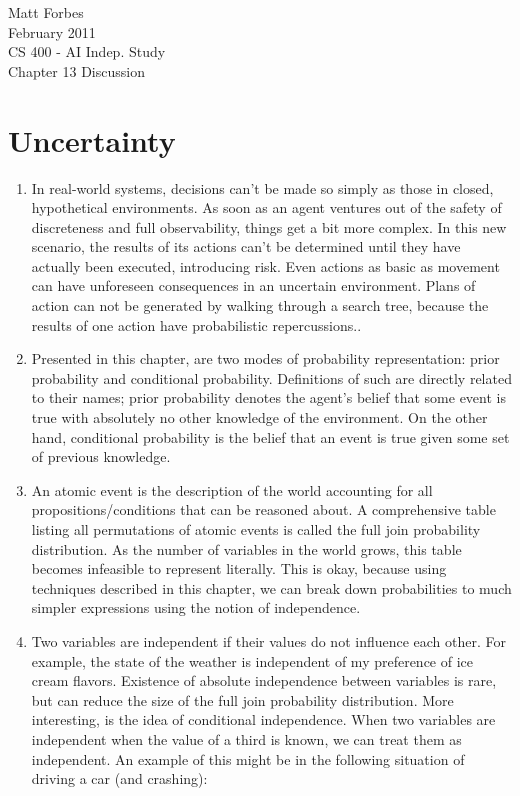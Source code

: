 \documentclass[a4paper,12pt]{article}
\begin{document}
Matt Forbes \\
February 2011 \\
CS 400 - AI Indep. Study \\
Chapter 13 Discussion

\section{Uncertainty}
\begin{enumerate}[]
  
  \item In real-world systems, decisions can't be made so simply as
    those in closed, hypothetical environments. As soon as an agent
    ventures out of the safety of discreteness and full observability,
    things get a bit more complex. In this new scenario, the results
    of its actions can't be determined until they have actually been
    executed, introducing risk. Even actions as basic as movement can
    have unforeseen consequences in an uncertain environment. Plans of
    action can not be generated by walking through a search tree,
    because the results of one action have probabilistic
    repercussions..
    
  \item Presented in this chapter, are two modes of probability
    representation: prior probability and conditional
    probability. Definitions of such are directly related to their
    names; prior probability denotes the agent's belief that some
    event is true with absolutely no other knowledge of the
    environment. On the other hand, conditional probability is the
    belief that an event is true given some set of previous knowledge.

  \item An atomic event is the description of the world accounting for
    all propositions/conditions that can be reasoned about. A
    comprehensive table listing all permutations of atomic events is
    called the full join probability distribution. As the number of
    variables in the world grows, this table becomes infeasible to
    represent literally. This is okay, because using techniques
    described in this chapter, we can break down probabilities to much
    simpler expressions using the notion of independence.

  \item Two variables are independent if their values do not influence
    each other. For example, the state of the weather is independent
    of my preference of ice cream flavors. Existence of absolute
    independence between variables is rare, but can reduce the size of
    the full join probability distribution. More interesting, is the
    idea of conditional independence. When two variables are
    independent when the value of a third is known, we can treat them
    as independent. An example of this might be in the following
    situation of driving a car (and crashing): 


\end{enumerate}
\end{document}
